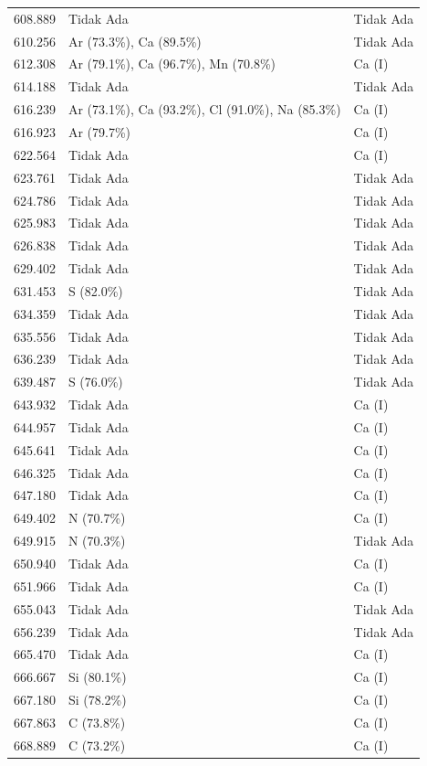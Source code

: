 \begin{onehalfspace}
\begin{longtable}{p{} p{} p{}}
    608.889 & Tidak Ada & Tidak Ada \\
    610.256 & Ar (73.3\%), Ca (89.5\%) & Tidak Ada \\
    612.308 & Ar (79.1\%), Ca (96.7\%), Mn (70.8\%) & Ca (I) \\
    614.188 & Tidak Ada & Tidak Ada \\
    616.239 & Ar (73.1\%), Ca (93.2\%), Cl (91.0\%), Na (85.3\%) & Ca (I) \\
    616.923 & Ar (79.7\%) & Ca (I) \\
    622.564 & Tidak Ada & Ca (I) \\
    623.761 & Tidak Ada & Tidak Ada \\
    624.786 & Tidak Ada & Tidak Ada \\
    625.983 & Tidak Ada & Tidak Ada \\
    626.838 & Tidak Ada & Tidak Ada \\
    629.402 & Tidak Ada & Tidak Ada \\
    631.453 & S (82.0\%) & Tidak Ada \\
    634.359 & Tidak Ada & Tidak Ada \\
    635.556 & Tidak Ada & Tidak Ada \\
    636.239 & Tidak Ada & Tidak Ada \\
    639.487 & S (76.0\%) & Tidak Ada \\
    643.932 & Tidak Ada & Ca (I) \\
    644.957 & Tidak Ada & Ca (I) \\
    645.641 & Tidak Ada & Ca (I) \\
    646.325 & Tidak Ada & Ca (I) \\
    647.180 & Tidak Ada & Ca (I) \\
    649.402 & N (70.7\%) & Ca (I) \\
    649.915 & N (70.3\%) & Tidak Ada \\
    650.940 & Tidak Ada & Ca (I) \\
    651.966 & Tidak Ada & Ca (I) \\
    655.043 & Tidak Ada & Tidak Ada \\
    656.239 & Tidak Ada & Tidak Ada \\
    665.470 & Tidak Ada & Ca (I) \\
    666.667 & Si (80.1\%) & Ca (I) \\
    667.180 & Si (78.2\%) & Ca (I) \\
    667.863 & C (73.8\%) & Ca (I) \\
    668.889 & C (73.2\%) & Ca (I) \\

\end{longtable}
\end{onehalfspace}
